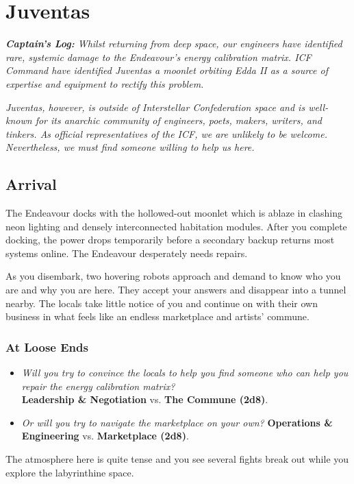 \documentclass[11pt, a5paper, parskip=half-, DIV=12]{scrartcl}
\begin{document}
\section*{Juventas}
\textit{\textbf{Captain's Log:} Whilst returning from deep space, our engineers have identified rare, systemic damage to the Endeavour’s energy calibration matrix. ICF Command have identified Juventas \textemdash{} a moonlet orbiting Edda II \textemdash{} as a source of expertise and equipment to rectify this problem.}

\textit{ Juventas, however, is outside of Interstellar Confederation space and is well-known for its anarchic community of engineers, poets, makers, writers, and tinkers. As official representatives of the ICF, we are unlikely to be welcome. Nevertheless, we must find someone willing to help us here.}

\subsection*{Arrival}

The Endeavour docks with the hollowed-out moonlet which is ablaze in clashing neon lighting and densely interconnected habitation modules. After you complete docking, the power drops temporarily before a secondary backup returns most systems online. The Endeavour desperately needs repairs.

As you disembark, two hovering robots approach and demand to know who you are and why you are here. They accept your answers and disappear into a tunnel nearby. The locals take little notice of you and continue on with their own business in what feels like an endless marketplace and artists' commune.

\subsubsection*{At Loose Ends}
\begin{itemize}
	\item \textit{Will you try to convince the locals to help you find someone who can help you repair the energy calibration matrix?} \\ \textbf{Leadership \& Negotiation} vs. \textbf{The Commune (2d8)}.
	\item \textit{Or will you try to navigate the marketplace on your own?} \textbf{Operations \& Engineering} vs. \textbf{Marketplace (2d8)}.
\end{itemize}
The atmosphere here is quite tense and you see several fights break out while you explore the labyrinthine space.
\newpage
\end{document}
